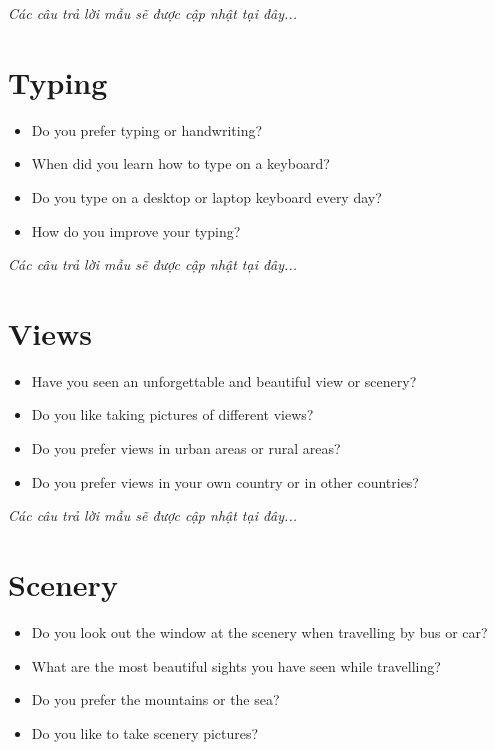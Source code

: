 \vspace{1em}
\textit{Các câu trả lời mẫu sẽ được cập nhật tại đây...}
\vspace{2em}

\section{Typing}
\begin{ieltsprompt}
\begin{itemize}[itemsep=4pt]
    \item Do you prefer typing or handwriting?
    \item When did you learn how to type on a keyboard?
    \item Do you type on a desktop or laptop keyboard every day?
    \item How do you improve your typing?
\end{itemize}
\end{ieltsprompt}

\vspace{1em}
\textit{Các câu trả lời mẫu sẽ được cập nhật tại đây...}
\vspace{2em}

\section{Views}
\begin{ieltsprompt}
\begin{itemize}[itemsep=4pt]
    \item Have you seen an unforgettable and beautiful view or scenery?
    \item Do you like taking pictures of different views?
    \item Do you prefer views in urban areas or rural areas?
    \item Do you prefer views in your own country or in other countries?
\end{itemize}
\end{ieltsprompt}

\vspace{1em}
\textit{Các câu trả lời mẫu sẽ được cập nhật tại đây...}
\vspace{2em}

\section{Scenery}
\begin{ieltsprompt}
\begin{itemize}[itemsep=4pt]
    \item Do you look out the window at the scenery when travelling by bus or car?
    \item What are the most beautiful sights you have seen while travelling?
    \item Do you prefer the mountains or the sea?
    \item Do you like to take scenery pictures?
\end{itemize}
\end{ieltsprompt}

